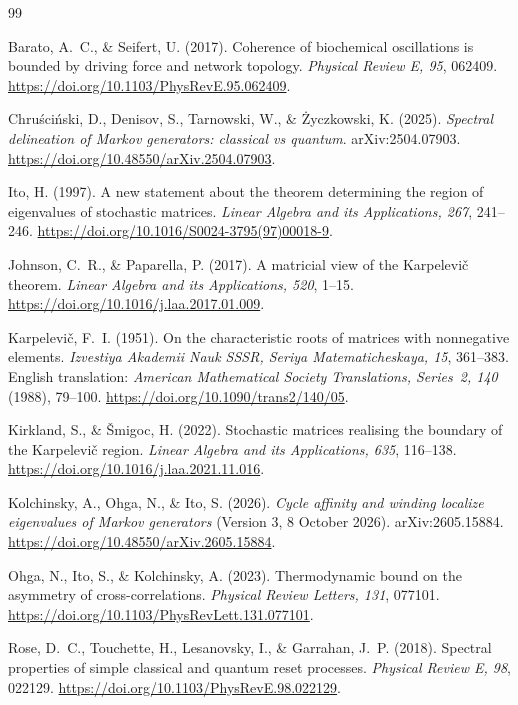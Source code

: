 \documentclass[11pt,a4paper]{article}
\numberwithin{equation}{section}
\theoremstyle{definition}
\theoremstyle{remark}
\begin{document}
\begin{thebibliography}{99}

Barato, A.~C., \& Seifert, U. (2017).
Coherence of biochemical oscillations is bounded by driving force and
network topology.
\emph{Physical Review E, 95}, 062409.
\url{https://doi.org/10.1103/PhysRevE.95.062409}.

Chru\'sci\'nski, D., Denisov, S., Tarnowski, W., \& \.Zyczkowski, K.
(2025).
\emph{Spectral delineation of Markov generators: classical vs quantum}.
arXiv:2504.07903.
\url{https://doi.org/10.48550/arXiv.2504.07903}.

Ito, H. (1997).
A new statement about the theorem determining the region of eigenvalues
of stochastic matrices.
\emph{Linear Algebra and its Applications, 267}, 241--246.
\url{https://doi.org/10.1016/S0024-3795(97)00018-9}.

Johnson, C.~R., \& Paparella, P. (2017).
A matricial view of the Karpelevi\v{c} theorem.
\emph{Linear Algebra and its Applications, 520}, 1--15.
\url{https://doi.org/10.1016/j.laa.2017.01.009}.

Karpelevi\v{c}, F.~I. (1951).
On the characteristic roots of matrices with nonnegative elements.
\emph{Izvestiya Akademii Nauk SSSR, Seriya Matematicheskaya, 15},
361--383. English translation: \emph{American Mathematical Society
Translations, Series~2, 140} (1988), 79--100.
\url{https://doi.org/10.1090/trans2/140/05}.

Kirkland, S., \& \v{S}migoc, H. (2022).
Stochastic matrices realising the boundary of the Karpelevi\v{c} region.
\emph{Linear Algebra and its Applications, 635}, 116--138.
\url{https://doi.org/10.1016/j.laa.2021.11.016}.

Kolchinsky, A., Ohga, N., \& Ito, S. (2026).
\emph{Cycle affinity and winding localize eigenvalues of Markov
generators} (Version 3, 8 October 2026). arXiv:2605.15884.
\url{https://doi.org/10.48550/arXiv.2605.15884}.

Ohga, N., Ito, S., \& Kolchinsky, A. (2023).
Thermodynamic bound on the asymmetry of cross-correlations.
\emph{Physical Review Letters, 131}, 077101.
\url{https://doi.org/10.1103/PhysRevLett.131.077101}.

Rose, D.~C., Touchette, H., Lesanovsky, I., \& Garrahan, J.~P. (2018).
Spectral properties of simple classical and quantum reset processes.
\emph{Physical Review E, 98}, 022129.
\url{https://doi.org/10.1103/PhysRevE.98.022129}.


\end{thebibliography}
\end{document}
